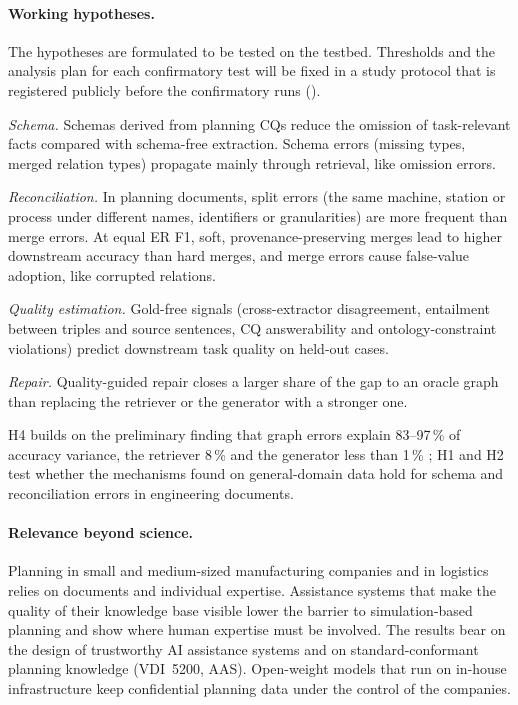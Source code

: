 \paragraph{Working hypotheses.}
The hypotheses are formulated to be tested on the  testbed. Thresholds and the analysis plan for each confirmatory test will be fixed in a study protocol that is registered publicly before the confirmatory runs ().
\begin{description}[leftmargin=1.1cm, style=sameline, itemsep=2pt]
  \item[H1] \emph{Schema.} Schemas derived from planning \acp{CQ} reduce the omission of task-relevant facts compared with schema-free extraction. Schema errors (missing types, merged relation types) propagate mainly through retrieval, like omission errors.
  \item[H2] \emph{Reconciliation.} In planning documents, split errors (the same machine, station or process under different names, identifiers or granularities) are more frequent than merge errors. At equal \ac{ER} F1, soft, provenance-preserving merges lead to higher downstream accuracy than hard merges, and merge errors cause false-value adoption, like corrupted relations.
  \item[H3] \emph{Quality estimation.} Gold-free signals (cross-extractor disagreement, entailment between triples and source sentences, \ac{CQ} answerability and ontology-constraint violations) predict downstream task quality on held-out cases.
  \item[H4] \emph{Repair.} Quality-guided repair closes a larger share of the gap to an oracle graph than replacing the retriever or the generator with a stronger one.
\end{description}
H4 builds on the preliminary finding that graph errors explain 83--97\,\% of accuracy variance, the retriever 8\,\% and the generator less than 1\,\% \parencite{reider2026graph}; H1 and H2 test whether the mechanisms found on general-domain data hold for schema and reconciliation errors in engineering documents.

\paragraph{Relevance beyond science.}
Planning in small and medium-sized manufacturing companies and in logistics relies on documents and individual expertise. Assistance systems that make the quality of their knowledge base visible lower the barrier to simulation-based planning and show where human expertise must be involved. The results bear on the design of trustworthy AI assistance systems and on standard-conformant planning knowledge (VDI~5200, \ac{AAS}). Open-weight models that run on in-house infrastructure keep confidential planning data under the control of the companies.

